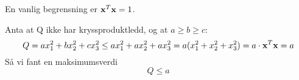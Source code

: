 En vanlig begrensning er $\mathbf{x}^T\mathbf{x} = 1$.

Anta at Q ikke har kryssproduktledd, og at $a \geq b \geq c$:
$$Q = ax_1^2 + bx_2^2 + cx_3^2
  \leq ax_1^2 + ax_2^2 + ax_3^2
  = a(x_1^2 + x_2^2 + x_3^2)
  = a\cdot\mathbf{x}^T\mathbf{x}
  = a$$
Så vi fant en maksimumsverdi
$$Q \leq a$$
